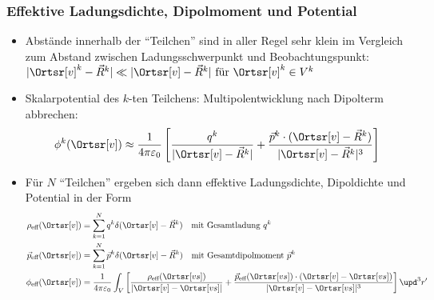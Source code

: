 \begin{frame}

  \frametitle{Effektive Ladungsdichte, Dipolmoment und Potential}
  \begin{itemize}[<+->]
  \item Abstände innerhalb der \enquote{Teilchen} sind in aller Regel sehr klein im Vergleich zum Abstand zwischen Ladungsschwerpunkt und Beobachtungspunkt: $|\Ortsr[v]^k -  \vec{R}^k| \ll  |\Ortsr[v] - \vec{R}^k | \text{ für } \Ortsr[v]^k \in V^k $
  \item \alert{Skalarpotential des $k$-ten Teilchens}: Multipolentwicklung nach Dipolterm abbrechen:
    $$
    \phi^k(\Ortsr[v]) \approx \frac{1}{4\pi\varepsilon_0} \left[ \frac{q^k}{|\Ortsr[v] - \vec{R}^k |} + \frac{\vec{p}^k \cdot (\Ortsr[v] - \vec{R}^k )}{|\Ortsr[v] - \vec{R}^k |^3} \right] 
    $$
  \item Für $N$ \enquote{Teilchen} ergeben sich dann \alert{effektive} Ladungsdichte, Dipoldichte und Potential in  der Form
    \begin{align*}
      \rho_{\text{eff}}(\Ortsr[v]) & = \sum_{k=1}^N q^k\delta (\Ortsr[v] - \vec{R}^k ) \quad\text{mit Gesamtladung } q^k\\
      \vec{p}_{\text{eff}}(\Ortsr[v]) &= \sum_{k=1}^N \vec{p}^k\delta (\Ortsr[v] - \vec{R}^k ) \quad\text{mit Gesamtdipolmoment } \vec{p}^k\\
      \phi _{\text{eff}}(\Ortsr[v]) &= \frac{1}{4\pi\varepsilon_0} \int_V \left[ \frac{\rho_{\text{eff}}(\Ortsr[vs])}{|\Ortsr[v] - \Ortsr[vs] |} + \frac{\vec{p}_{\text{eff}}(\Ortsr[vs])  \cdot (\Ortsr[v] - \Ortsr[vs] )}{|\Ortsr[v] - \Ortsr[vs] |^3} \right] \upd^3 r'  
      \end{align*}
 \end{itemize}
  
  \end{frame}

